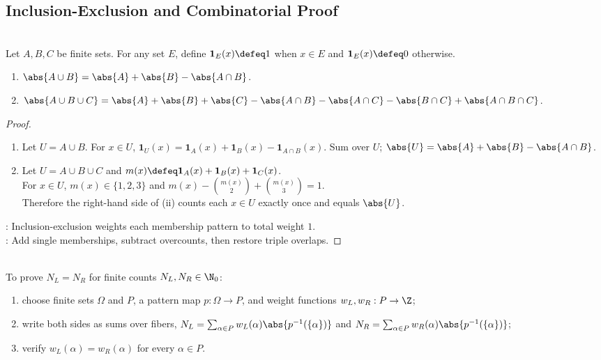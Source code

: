 \subsection{Inclusion-Exclusion and Combinatorial Proof}

\begin{proposition} \label{prop:finite-inclusion-exclusion-two-three-sets} \\
Let $A,B,C$ be finite sets. For any set $E$, define $\mathbf{1}_E(x)\defeq1$ when $x\in E$ and $\mathbf{1}_E(x)\defeq0$ otherwise.
\begin{enumerate}[label=(\roman*)]
\setlength{\itemsep}{0pt}
\item $\abs{A\cup B}=\abs{A}+\abs{B}-\abs{A\cap B}$.
\item $\abs{A\cup B\cup C}=\abs{A}+\abs{B}+\abs{C}-\abs{A\cap B}-\abs{A\cap C}-\abs{B\cap C}+\abs{A\cap B\cap C}$.
\end{enumerate}
\begin{proof}
\begin{enumerate}[label=(\roman*)]
\setlength{\itemsep}{0pt}
\item Let $U=A\cup B$. For $x\in U$, $\mathbf{1}_U(x)=\mathbf{1}_A(x)+\mathbf{1}_B(x)-\mathbf{1}_{A\cap B}(x)$. Sum over $U$; $\abs{U}=\abs{A}+\abs{B}-\abs{A\cap B}$.
\item Let $U=A\cup B\cup C$ and $m(x)\defeq\mathbf{1}_A(x)+\mathbf{1}_B(x)+\mathbf{1}_C(x)$.\\
For $x\in U$, $m(x)\in\{1,2,3\}$ and $m(x)-\binom{m(x)}{2}+\binom{m(x)}{3}=1$.\\
Therefore the right-hand side of (ii) counts each $x\in U$ exactly once and equals $\abs{U}$.
\end{enumerate}
: Inclusion-exclusion weights each membership pattern to total weight $1$.\\
: Add single memberships, subtract overcounts, then restore triple overlaps.
\end{proof}
\end{proposition}

\begin{method} \label{meth:combinatorial-proof-by-classification} \\
To prove $N_L=N_R$ for finite counts $N_L,N_R\in\N_0$:
\begin{enumerate}[label=(\roman*)]
\setlength{\itemsep}{0pt}
\item choose finite sets $\Omega$ and $P$, a pattern map $p:\Omega\to P$, and weight functions $w_L,w_R:P\to\Z$;
\item write both sides as sums over fibers, $N_L=\sum_{\alpha\in P}w_L(\alpha)\abs{p^{-1}(\{\alpha\})}$ and $N_R=\sum_{\alpha\in P}w_R(\alpha)\abs{p^{-1}(\{\alpha\})}$;
\item verify $w_L(\alpha)=w_R(\alpha)$ for every $\alpha\in P$.
\end{enumerate}
\end{method}
